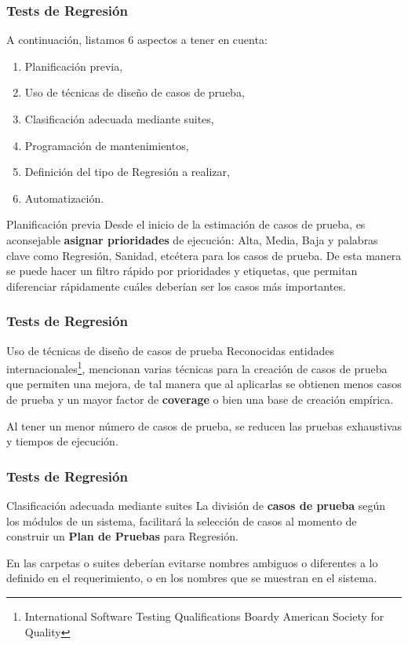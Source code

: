 \begin{frame}
    \frametitle{Tests de Regresión}
    A continuación, listamos 6 aspectos a tener en cuenta:
    
    \begin{enumerate}
        \item Planificación previa,
        \item Uso de técnicas de diseño de casos de prueba, 
        \item Clasificación adecuada mediante suites, 
        \item Programación de mantenimientos,
        \item Definición del tipo de Regresión a realizar,
        \item Automatización.
    \end{enumerate}

    \begin{block}{Planificación previa}
        Desde el inicio de la estimación de casos de prueba, es aconsejable 
        \textbf{asignar prioridades} de ejecución: Alta, Media, Baja y palabras
        clave como Regresión, Sanidad, etcétera para los casos de prueba.
        De esta manera se puede hacer un filtro rápido por prioridades y etiquetas,
        que permitan diferenciar rápidamente cuáles deberían ser los casos más
        importantes.
    \end{block}
\end{frame}

\begin{frame}
    \frametitle{Tests de Regresión}
    \begin{block}{Uso de técnicas de diseño de casos de prueba}
        Reconocidas entidades internacionales\footnote{International
        Software Testing Qualifications Boardy American Society for
        Quality}, mencionan varias técnicas para la creación de casos
        de prueba que permiten una mejora, de tal manera que al
        aplicarlas se obtienen menos casos de prueba y un mayor
        factor de \textbf{coverage} o bien una base de creación empírica.

        Al tener un menor número de casos de prueba, se reducen las 
        pruebas exhaustivas y tiempos de ejecución.
    \end{block}
\end{frame}

\begin{frame}
    \frametitle{Tests de Regresión}
    \begin{block}{Clasificación adecuada mediante suites}
        La división de \textbf{casos de prueba} según los módulos
        de un sistema, facilitará la selección de casos al momento
        de construir un \textbf{Plan de Pruebas} para Regresión.
        
        En las carpetas o suites deberían evitarse nombres ambiguos o 
        diferentes a lo definido en el requerimiento, o en los nombres 
        que se muestran en el sistema.
    \end{block}
\end{frame}

